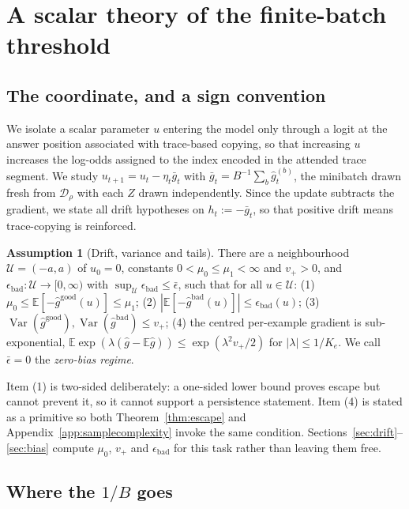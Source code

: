 \documentclass{article}
\theoremstyle{plain}
\theoremstyle{definition}
\newtheorem{assumption}{Assumption}
\theoremstyle{remark}
\newcommand{\E}{\mathbb{E}}
\newcommand{\Var}{\operatorname{Var}}
\newcommand{\1}{\mathbf{1}}
\newcommand{\cD}{\mathcal{D}}
\newcommand{\cU}{\mathcal{U}}
\newcommand{\good}{\mathrm{good}}
\newcommand{\bad}{\mathrm{bad}}
\begin{document}
\section{A scalar theory of the finite-batch threshold}
\label{sec:scalar}

\subsection{The coordinate, and a sign convention}

We isolate a scalar parameter $u$ entering the model only through a logit at the
answer position associated with trace-based copying, so that increasing $u$
increases the log-odds assigned to the index encoded in the attended trace
segment. We study $u_{t+1} = u_t - \eta_t\bar g_t$ with
$\bar g_t = B^{-1}\sum_b \hat g_t^{(b)}$, the minibatch drawn fresh from
$\cD_\rho$ with each $Z$ drawn independently. Since the update subtracts the
gradient, we state all drift hypotheses on $h_t := -\bar g_t$, so that positive
drift means trace-copying is reinforced.

\begin{assumption}[Drift, variance and tails]
\label{ass:main}
There are a neighbourhood $\cU = (-a,a)$ of $u_0 = 0$, constants
$0<\mu_0\le\mu_1<\infty$ and $v_+ > 0$, and
$\epsilon_\bad:\cU\to[0,\infty)$ with $\sup_\cU\epsilon_\bad\le\bar\epsilon$,
such that for all $u\in\cU$: (1) $\mu_0\le\E[-\hat g^{\good}(u)]\le\mu_1$;
(2) $|\E[-\hat g^{\bad}(u)]|\le\epsilon_\bad(u)$;
(3) $\Var(\hat g^{\good}),\Var(\hat g^{\bad})\le v_+$;
(4) the centred per-example gradient is sub-exponential,
$\E\exp(\lambda(\hat g-\E\hat g))\le\exp(\lambda^2v_+/2)$ for $|\lambda|\le1/K_e$.
We call $\bar\epsilon = 0$ the \emph{zero-bias regime}.
\end{assumption}

Item (1) is two-sided deliberately: a one-sided lower bound proves escape but
cannot prevent it, so it cannot support a persistence statement. Item (4) is
stated as a primitive so both Theorem~\ref{thm:escape} and
Appendix~\ref{app:samplecomplexity} invoke the same condition.
Sections~\ref{sec:drift}--\ref{sec:bias} compute $\mu_0$, $v_+$ and
$\epsilon_\bad$ for this task rather than leaving them free.

\subsection{Where the \texorpdfstring{$1/B$}{1/B} goes}
\label{sec:variance}
\end{document}
